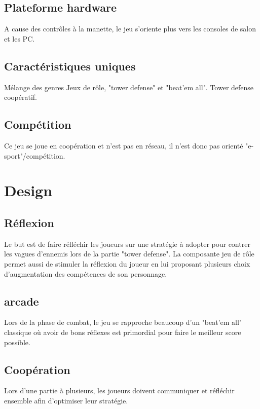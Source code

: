 \documentclass[12pt]{article}
\begin{document}
\subsection{Plateforme hardware}
A cause des contrôles à la manette, le jeu s'oriente plus vers les consoles de salon et les PC.
\subsection{Caractéristiques uniques}
Mélange des genres Jeux de rôle, "tower defense" et "beat'em all".
Tower defense coopératif.
\subsection{Compétition}
Ce jeu se joue en coopération et n'est pas en réseau, il n'est donc pas orienté "e-sport"/compétition.


\section{Design}
\subsection{Réflexion}
Le but est de faire réfléchir les joueurs sur une stratégie à adopter pour contrer les vagues d'ennemis lors de la partie "tower defense". La composante jeu de rôle permet aussi de stimuler la réflexion du joueur en lui proposant plusieurs choix d'augmentation des compétences de son personnage.
\subsection{arcade}
Lors de la phase de combat, le jeu se rapproche beaucoup d'un "beat'em all" classique où avoir de bons réflexes est primordial pour faire le meilleur score possible.
\subsection{Coopération}
Lors d'une partie à plusieurs, les joueurs doivent communiquer et réfléchir ensemble afin d'optimiser leur stratégie.
	
\end{document}
